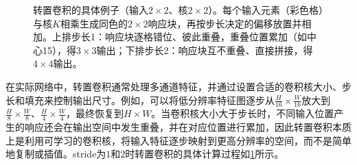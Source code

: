 \begin{figure}[H]
    \caption{转置卷积的具体例子（输入$2\times 2$、核$2\times 2$）。每个输入元素（彩色格）与核$K$相乘生成同色的$2\times 2$响应块，再按步长决定的偏移放置并相加。上排步长1：响应块逐格错位、彼此重叠，重叠位置累加（如中心15），得$3\times 3$输出；下排步长2：响应块互不重叠、直接拼接，得$4\times 4$输出。}
    \label{fig:transpose_convolution}
\end{figure}

在实际网络中，转置卷积通常处理多通道特征，并通过设置合适的卷积核大小、步长和填充来控制输出尺寸。例如，可以将低分辨率特征图逐步从$\frac{H}{16}\times\frac{W}{16}$放大到$\frac{H}{8}\times\frac{W}{8}$、$\frac{H}{4}\times\frac{W}{4}$，最终恢复到$H\times W$。当卷积核大小大于步长时，不同输入位置产生的响应还会在输出空间中发生重叠，并在对应位置进行累加，因此转置卷积本质上是利用可学习的卷积核，将输入特征逐步映射到更高分辨率的空间，而不是简单地复制或插值。stride为$1$和$2$时转置卷积的具体计算过程如\cref{fig:transpose_convolution}所示。


